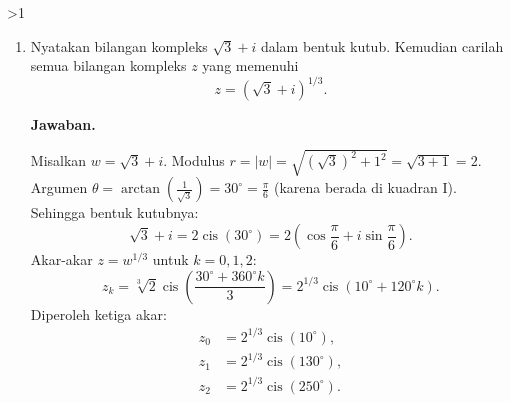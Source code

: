 \documentclass[12pt]{article}
\newcommand{\answername}{Jawaban}
\newenvironment{soaljawab}[1]{%
    \ifnum#1>1\clearpage\fi
    \begin{tcolorbox}[enhanced,breakable,height fill,height fixed for=all,
        sharp corners,colback=white,colframe=black,boxrule=0.4bp,
        boxsep=0pt,left=12bp,right=12bp,top=6bp,bottom=10bp,
        before skip=0pt,after skip=0pt,pad at break=8bp]
    \fontsize{12bp}{14bp}\selectfont
    \setlength{\abovedisplayskip}{8bp}
    \setlength{\belowdisplayskip}{8bp}
    \setlength{\abovedisplayshortskip}{8bp}
    \setlength{\belowdisplayshortskip}{8bp}
    \renewcommand{\arraystretch}{1.15}
    \begin{enumerate}[start=#1,topsep=0pt]
}{%
    \end{enumerate}
    \end{tcolorbox}
}
\newcommand{\jawaban}{\par\medskip\textbf{\answername.}\par\smallskip}
\begin{document}
\begin{soaljawab}{4}
\item Nyatakan bilangan kompleks $\sqrt{3} + i$ dalam bentuk kutub. Kemudian carilah semua bilangan kompleks $z$ yang memenuhi
        \[
          z = (\sqrt{3} + i)^{1/3}.
        \]
\jawaban
Misalkan $w = \sqrt{3} + i$.
        Modulus $r = |w| = \sqrt{(\sqrt{3})^2 + 1^2} = \sqrt{3 + 1} = 2$.
        Argumen $\theta = \arctan\left(\frac{1}{\sqrt{3}}\right) = 30^\circ = \frac{\pi}{6}$ (karena berada di kuadran I).
        Sehingga bentuk kutubnya:
        \[
          \sqrt{3} + i = 2 \operatorname{cis}(30^\circ) = 2 \left(\cos\frac{\pi}{6} + i\sin\frac{\pi}{6}\right).
        \]
        Akar-akar $z = w^{1/3}$ untuk $k = 0, 1, 2$:
        \[
          z_k = \sqrt[3]{2} \operatorname{cis}\left(\frac{30^\circ + 360^\circ k}{3}\right) = 2^{1/3} \operatorname{cis}(10^\circ + 120^\circ k).
        \]
        Diperoleh ketiga akar:
        \begin{align*}
          z_0 & = 2^{1/3} \operatorname{cis}(10^\circ),  \\
          z_1 & = 2^{1/3} \operatorname{cis}(130^\circ), \\
          z_2 & = 2^{1/3} \operatorname{cis}(250^\circ).
        \end{align*}
\end{soaljawab}
\end{document}
